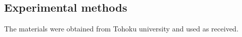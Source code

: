 \subsection{Experimental methods}
The materials were obtained from Tohoku university and used as received. 

